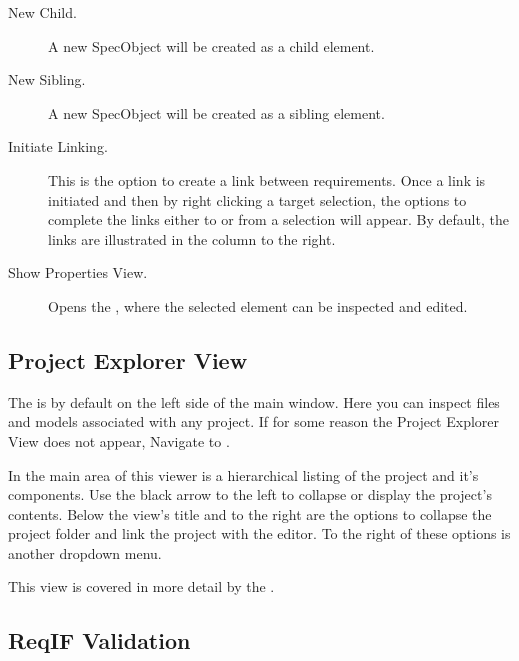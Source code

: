 \begin{description}
\item
  [New Child.] A new SpecObject will be created as a child element.
\item
  [New Sibling.] A new SpecObject will be created as a sibling element.
\item
  [Initiate Linking.] This is the option to create a link between requirements. Once a link is initiated and then by right clicking a target selection, the options to complete the links either to or from a selection will appear. By default, the links are illustrated in the  column to the right. 
\item
  [Show Properties View.] Opens the , where the selected element can be inspected and edited.
\end{description}

\subsection{Project Explorer View}

The  is by default on the left side of the main window. Here you can inspect files and models associated with any project. If for some reason the Project Explorer View does not appear, Navigate to .

In the main area  of this viewer is a hierarchical listing of the project and it's components. Use the black arrow to the left to collapse or display the project's contents. Below the view's title and to the right are the options to collapse the project folder and link the project with the editor. To the right of these options is another dropdown menu.

This view is covered in more detail by the .

\subsection{ReqIF Validation}
\label{sec:reqif-validation}

